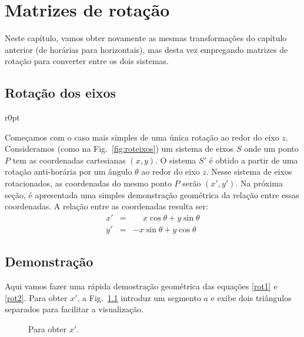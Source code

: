 \chapter{Matrizes de rotação}

Neste capítulo, vamos obter novamente as mesmas transformações do capítulo anterior (de horárias para horizontais), mas desta vez empregando matrizes de rotação para converter entre os dois sistemas.

\section{Rotação dos eixos}

\begin{wrapfigure}[14]{r}{0pt}

\caption{Rotação por um ângulo $\theta$ ao redor do eixo $z$.}
\label{fig:roteixos}
\end{wrapfigure}

Começamos com o caso mais simples de uma única rotação ao redor do eixo $z$. Consideramos (como na Fig.~\ref{fig:roteixos}) um sistema de eixos $S$ onde um ponto $P$ tem as coordenadas cartesianas $(x, y)$. O sistema $S'$ é obtido a partir de uma rotação anti-horária por um ângulo $\theta$ ao redor do eixo $z$. Nesse sistema de eixos rotacionados, as coordenadas do mesmo ponto $P$ serão $(x', y')$. Na próxima seção, é apresentada uma simples demonstração geométrica da relação entre essas coordenadas. A relação entre as coordenadas resulta ser:
%
\begin{eqnarray}
x' &=& \phantom{+} x \cos \theta + y \sin \theta \label{rot1}\\
y' &=& -x \sin \theta + y \cos \theta \label{rot2}
\end{eqnarray}

\section*{Demonstração}

Aqui vamos fazer uma rápida demostração geométrica das equações \ref{rot1} e \ref{rot2}. Para obter $x'$, a Fig.~\ref{fig:roteixosx} introduz um segmento $a$ e exibe dois triângulos separados para facilitar a visualização.
%
\begin{figure}[h]
\centering
\qquad
\qquad

\caption{Para obter $x'$.}
\label{fig:roteixosx}
\end{figure}

